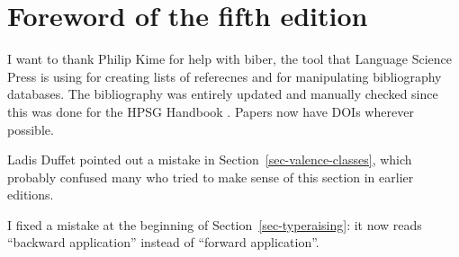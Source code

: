 
\section*{Foreword of the fifth edition}

I want to thank Philip Kime for help with biber, the tool that Language Science Press is using for
creating lists of referecnes and for manipulating bibliography databases. The bibliography was
entirely updated and manually checked since this was done for the HPSG Handbook \citep*{HPSGHandbook}. Papers
now have DOIs wherever possible.

Ladis Duffet pointed out a mistake in Section~\ref{sec-valence-classes}, which probably confused many who tried to make
sense of this section in earlier editions.










%
%

I fixed a mistake at the beginning of Section~\ref{sec-typeraising}: it now reads ``backward
application'' instead of ``forward application''.

